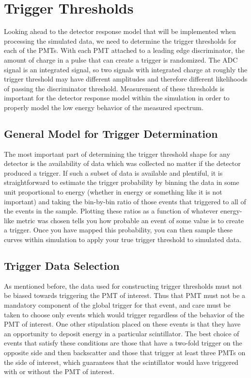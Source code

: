 \section{Trigger Thresholds} \label{sec:triggerThresh}

Looking ahead to the detector response model that will be implemented when processing
the simulated data, we need to determine the trigger thresholds for each of the
PMTs. With each PMT attached to a leading edge discriminator, the
amount of charge in a pulse that can create a trigger is randomized. The ADC signal
is an integrated signal, so two signals with integrated charge
at roughly the trigger threshold may have
different amplitudes and therefore different likelihoods of passing the discriminator threshold.
Measurement of these thresholds is important for the detector response model within the simulation
in order to properly model the low energy behavior of the measured spectrum.


\subsection{General Model for Trigger Determination} \label{ssec:genTrigModel}

The most important part of determining the trigger threshold shape for 
any detector is the availability of data which was collected no matter if 
the detector produced a trigger. If such a subset of 
data is available and plentiful, it is straightforward to estimate
the trigger probability by binning the data in some unit proportional to 
energy (whether in energy or something like it is not important) and taking 
the bin-by-bin ratio of those events that triggered to all of the events in the 
sample. Plotting these ratios as a function of whatever energy-like metric was chosen tells 
you how probable an event of some value is to create a trigger.
Once you have mapped this probability, you can then sample these curves within 
simulation to apply your true trigger threshold to simulated data.


\subsection{Trigger Data Selection}
As mentioned before, the data used for constructing trigger thresholds must not be 
biased towards triggering the PMT of interest. Thus that PMT must not be a mandatory 
component of the global trigger for that event, and care must be taken to choose only 
events which would trigger regardless of the behavior of the PMT of interest. One
other stipulation placed on these events is that they have an opportunity to 
deposit energy in a particular scintillator. The best choice of events that 
satisfy these conditions are those that have a two-fold trigger on the opposite side 
and then backscatter and those that trigger at least three PMTs on the side of 
interest, which guarantees that the scintillator would have triggered with or without 
the PMT of interest.	

